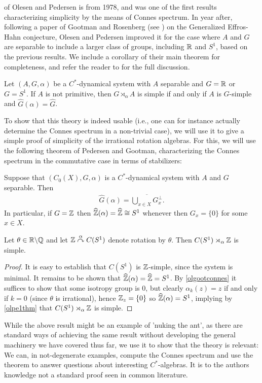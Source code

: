  of Olesen and Pedersen is from 1978, and was one of the first results characterizing simplicity by the means of Connes spectrum. In year after, following a paper of Gootman and Rosenberg (see \cite{gootman1979structure}) on the Generalized Effros-Hahn conjecture, Olesen and Pedersen improved it for the case where $A$ and $G$ are separable to include a larger class of groups, including $\mathbb{R}$ and $S^1$, based on the previous results. We include a corollary of their main theorem for completeness, and refer the reader to \cite{olesenpedersen2} for the full discussion.
\begin{corollary}
	Let $(A,G,\alpha)$ be a $C^*$-dynamical system with $A$ separable and $G = \mathbb{R}$ or $G=S^1$. If $A$ is not primitive, then $G \rtimes_\alpha A$ is simple if and only if $A$ is $G$-simple and $\hat G(\alpha) = \hat G$.
\end{corollary}

To show that this theory is indeed usable (i.e., one can for instance actually determine the Connes spectrum in a non-trivial case), we will use it to give a simple proof of simplicity of the irrational rotation algebras. For this, we will use the following theorem of Pedersen and Gootman, characterizing the Connes spectrum in the commutative case in terms of stabilizers:
\begin{theorem}
	Suppose that $(C_0(X),G,\alpha)$ is a $C^*$-dynamical system with $A$ and $G$ separable. Then
	\begin{align*}
		\hat G(\alpha) = \overline{\bigcup_{x \in X} G_x^\perp}.
	\end{align*}
	In particular, if $G = \mathbb{Z}$ then $\widehat{\mathbb{Z}}(\alpha) = \widehat{\mathbb{Z}} \cong S^1$ whenever then $G_x=\{0\}$ for some $x \in X$.
	\label{olgootconnes}
\end{theorem}
\begin{example}
	Let $\theta \in \mathbb{R} \backslash \mathbb{Q}$ and let $\mathbb{Z} \stackrel{\alpha}{\curvearrowright} C(S^1)$ denote rotation by $\theta$. Then $C(S^1) \rtimes_\alpha \mathbb{Z}$ is simple.
\end{example}
\begin{proof}
	It is easy to establish that $C(S^1)$ is $\mathbb{Z}$-simple, since the system is minimal. It remains to be shown that $\widehat{\mathbb{Z}}(\alpha) = \widehat{\mathbb{Z}} = S^1$. By \cref{olgootconnes} it suffices to show that some isotropy group is $0$, but clearly $\alpha_k(z) = z$ if and only if $k = 0$ (since $\theta$ is irrational), hence $\mathbb{Z}_{z} = \{0\}$ so $\widehat{\mathbb{Z}} (\alpha) = S^1$, implying by \cref{olpe1thm} that $C(S^1) \rtimes_\alpha \mathbb{Z}$ is simple.
\end{proof}
While the above result might be an example of 'nuking the ant', as there are standard ways of achieving the same result without developing the general machinery we have covered thus far, we use it to show that the theory is relevant: We can, in not-degenerate examples, compute the Connes spectrum and use the theorem to answer questions about interesting $C^*$-algebras. It is to the authors knowledge not a standard proof seen in common literature.
